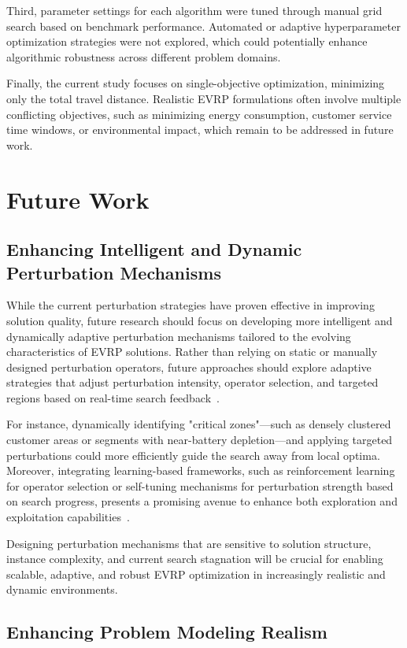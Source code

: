 Third, parameter settings for each algorithm were tuned through manual grid search based on benchmark performance.  
Automated or adaptive hyperparameter optimization strategies were not explored, which could potentially enhance algorithmic robustness across different problem domains.

Finally, the current study focuses on single-objective optimization, minimizing only the total travel distance.  
Realistic EVRP formulations often involve multiple conflicting objectives, such as minimizing energy consumption, customer service time windows, or environmental impact, which remain to be addressed in future work.

\section{Future Work}
\subsection{Enhancing Intelligent and Dynamic Perturbation Mechanisms}

While the current perturbation strategies have proven effective in improving solution quality, future research should focus on developing more intelligent and dynamically adaptive perturbation mechanisms tailored to the evolving characteristics of EVRP solutions.  
Rather than relying on static or manually designed perturbation operators, future approaches should explore adaptive strategies that adjust perturbation intensity, operator selection, and targeted regions based on real-time search feedback~\cite{hulagu2021electric}.

For instance, dynamically identifying "critical zones"—such as densely clustered customer areas or segments with near-battery depletion—and applying targeted perturbations could more efficiently guide the search away from local optima.  
Moreover, integrating learning-based frameworks, such as reinforcement learning for operator selection or self-tuning mechanisms for perturbation strength based on search progress, presents a promising avenue to enhance both exploration and exploitation capabilities~\cite{liu2023electric}.

Designing perturbation mechanisms that are sensitive to solution structure, instance complexity, and current search stagnation will be crucial for enabling scalable, adaptive, and robust EVRP optimization in increasingly realistic and dynamic environments.


\subsection{Enhancing Problem Modeling Realism}

